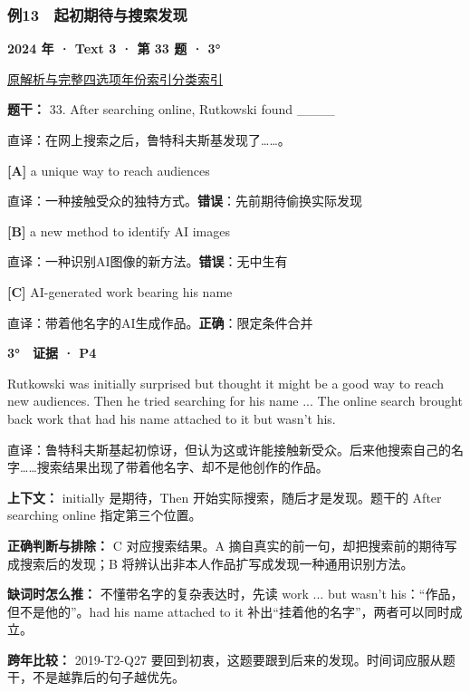 \documentclass[11pt,a4paper]{article}
\begin{document}
\subsubsection{例13　起初期待与搜索发现}\label{case-2024-T3-Q33}
\noindent\textbf{2024 年 · Text 3 · 第 33 题 · 3°}\par\noindent \href{https://zj139.github.io/math-notes/english/45e4c8a550f2be01daf2d7ac/\#q33}{原解析与完整四选项}\quad \hyperref[idx-2024-T3-Q33]{年份索引}\quad \hyperref[class-R06]{分类索引}\par\smallskip
\noindent\textbf{题干：} 33. After searching online, Rutkowski found \_\_\_\_\par\smallskip
直译：在网上搜索之后，鲁特科夫斯基发现了……。

\noindent\textbf{[A]} a unique way to reach audiences\par\nopagebreak
\noindent 直译：一种接触受众的独特方式。\quad\textbf{错误}：先前期待偷换实际发现\par\smallskip
{}\noindent\textbf{[B]} a new method to identify AI images\par\nopagebreak
\noindent 直译：一种识别AI图像的新方法。\quad\textbf{错误}：无中生有\par\smallskip
{}\noindent\textbf{[C]} AI-generated work bearing his name\par\nopagebreak
\noindent 直译：带着他名字的AI生成作品。\quad\textbf{正确}：限定条件合并\par\smallskip
\begin{evidence}\textbf{3°　证据 · P4}\par Rutkowski was initially surprised but thought it might be a good way to reach new audiences. Then he tried searching for his name ... The online search brought back work that had his name attached to it but wasn’t his.\par 直译：鲁特科夫斯基起初惊讶，但认为这或许能接触新受众。后来他搜索自己的名字……搜索结果出现了带着他名字、却不是他创作的作品。\end{evidence}
\noindent\textbf{上下文：} initially 是期待，Then 开始实际搜索，随后才是发现。题干的 After searching online 指定第三个位置。\par\smallskip
\noindent\textbf{正确判断与排除：} C 对应搜索结果。A 摘自真实的前一句，却把搜索前的期待写成搜索后的发现；B 将辨认出非本人作品扩写成发现一种通用识别方法。\par\smallskip
\noindent\textbf{缺词时怎么推：} 不懂带名字的复杂表达时，先读 work ... but wasn’t his：“作品，但不是他的”。had his name attached to it 补出“挂着他的名字”，两者可以同时成立。\par\smallskip
\noindent\textbf{跨年比较：} 2019-T2-Q27 要回到初衷，这题要跟到后来的发现。时间词应服从题干，不是越靠后的句子越优先。\par\smallskip
\clearpage
\end{document}
